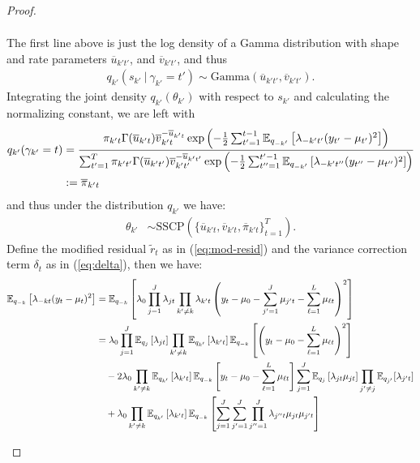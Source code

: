 \begin{proof}
\begin{enumerate}[label=\roman*.]
\begin{align*}
\end{align*}
The first line above is just the log density of a Gamma distribution with shape and rate parameters $\overline{u}_{k't'}$, and $\overline{v}_{k't'}$, and thus 
\begin{align*}
    q_{k'}(s_{k'} \:|\: \gamma_{k'} = t') \sim \text{Gamma}(\overline{u}_{k't'}, \overline{v}_{k't'}).
\end{align*}
Integrating the joint density $q_{k'}(\theta_{k'})$ with respect to $s_{k'}$ and calculating the normalizing constant, we are left with 
\begin{align*}
    q_{k'}(\gamma_{k'} = t) &= \frac{\pi_{k't}\Gamma(\overline{u}_{k't})\overline{v}_{k't}^{-\overline{u}_{k't}}\exp\left( -\frac{1}{2} \sum_{t'=1}^{t-1} \mathbb{E}_{q_{-k'}}\left[\lambda_{-k't'}(y_{t'} - \mu_{t'})^2\right] \right)}{\sum_{t'=1}^T \pi_{k't'}\Gamma(\overline{u}_{k't'})\overline{v}_{k't'}^{-\overline{u}_{k't'}}\exp\left( -\frac{1}{2} \sum_{t''=1}^{t'-1} \mathbb{E}_{q_{-k'}}\left[\lambda_{-k't''}(y_{t''} - \mu_{t''})^2\right] \right)} \\
    &:= \overline{\pi}_{k't} 
\end{align*}
and thus under the distribution $q_{k'}$ we have:
\begin{align*}
    \theta_{k'} &\sim \text{SSCP}(\{\overline{u}_{k't}, \overline{v}_{k't}, \overline{\pi}_{k't}\}_{t=1}^T). 
\end{align*}
Define the modified residual $\tilde{r}_t$ as in (\ref{eq:mod-resid}) and the variance correction term $\delta_t$ as in (\ref{eq:delta}), then we have:
\footnotesize
\begin{align*}
    \E_{q_{-k}}\left[\lambda_{-kt}(y_t - \mu_t)^2\right] &= \E_{q_{-k}}\left[\lambda_0\prod_{j =1}^J\lambda_{jt} \prod_{k' \neq k} \lambda_{k't}\left(y_t - \mu_0 - \sum_{j'=1}^J \mu_{j't} - \sum_{\ell=1}^L \mu_{\ell t}\right)^2\right] \\
    &= \lambda_0\prod_{j =1}^J\E_{q_{j}}\left[\lambda_{jt}\right] \prod_{k'\neq k} \E_{q_{k'}}\left[\lambda_{k't}\right]\E_{q_{-k}}\left[\left(y_t - \mu_0 - \sum_{\ell=1}^L \mu_{\ell t}\right)^2\right] \\
    &\quad -2 \lambda_0 \prod_{k'\neq k} \E_{q_{k'}}\left[\lambda_{k't}\right]\E_{q_{-k}}\left[y_t - \mu_0  - \sum_{\ell=1}^L \mu_{\ell t}\right] \sum_{j=1}^J \E_{q_{j}}\left[\lambda_{jt} \mu_{jt}\right]\prod_{j' \neq j}\E_{q_{j'}}[\lambda_{j't}]  \\
    &\quad + \lambda_0 \prod_{k' \neq k} \E_{q_{k'}}\left[ \lambda_{k't}\right]\E_{q_{-k}}\left[\sum_{j=1}^J\sum_{j'=1}^J  \prod_{j''=1}^J \lambda_{j''t} \mu_{jt} \mu_{j't}\right] \\

\end{align*}
\end{enumerate}
\end{proof}
